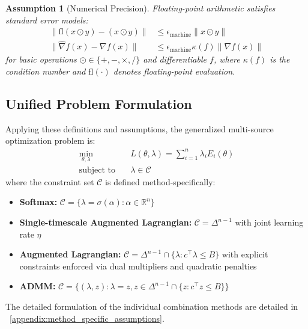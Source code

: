\documentclass[preprint,12pt,authoryear]{elsarticle}
\newtheorem{assumption}{Assumption}
\begin{document}
\begin{assumption}[Numerical Precision]\label{assump:precision}
Floating-point arithmetic satisfies standard error models:
\begin{align}
    \|\text{fl}(x \odot y) - (x \odot y)\| &\leq \epsilon_{\mathrm{machine}} \|x \odot y\| \\
    \|\hat{\nabla}f(x) - \nabla f(x)\| &\leq \epsilon_{\mathrm{machine}} \kappa(f) \|\nabla f(x)\|
\end{align}
for basic operations $\odot \in \{+, -, \times, /\}$ and differentiable $f$, where $\kappa(f)$ is the condition number and $\text{fl}(\cdot)$ denotes floating-point evaluation.
\end{assumption}



\subsection{Unified Problem Formulation}

Applying these definitions and assumptions, the generalized multi-source optimization problem is:
\begin{equation}
\label{eq:unified_problem}
\begin{aligned}
    \min_{\theta, \lambda} \quad & L(\theta, \lambda) = \sum_{i=1}^n \lambda_i E_i(\theta) \\
    \text{subject to} \quad & \lambda \in \mathcal{C}
\end{aligned}
\end{equation}
where the constraint set $\mathcal{C}$ is defined method-specifically:
\begin{itemize}[leftmargin=*]
    \item \textbf{Softmax:} $\mathcal{C} = \{\lambda = \sigma(\alpha) : \alpha \in \mathbb{R}^n\}$
    \item \textbf{Single-timescale Augmented Lagrangian:} $\mathcal{C} = \Delta^{n-1}$ with joint learning rate $\eta$
    \item \textbf{Augmented Lagrangian:} $\mathcal{C} = \Delta^{n-1} \cap \{ \lambda : c^\top \lambda \leq B \}$ with explicit constraints enforced via dual multipliers and quadratic penalties
    \item \textbf{ADMM:} $\mathcal{C} = \{(\lambda, z) : \lambda = z, z \in \Delta^{n-1} \cap \{ z : c^\top z \leq B \}\}$
\end{itemize}

The detailed formulation of the individual combination methods are detailed in ~\ref{appendix:method_specific_assumptions}.
\end{document}
